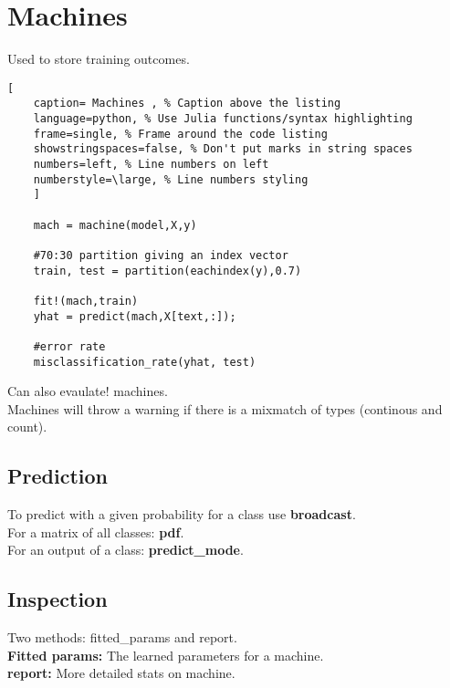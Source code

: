 \documentclass[11pt]{scrartcl} %
\begin{document}
\newpage

\section{Machines}

Used to store training outcomes.

\begin{lstlisting}[
	caption= Machines , % Caption above the listing
	language=python, % Use Julia functions/syntax highlighting
	frame=single, % Frame around the code listing
	showstringspaces=false, % Don't put marks in string spaces
	numbers=left, % Line numbers on left
	numberstyle=\large, % Line numbers styling
	]

	mach = machine(model,X,y)
	
	#70:30 partition giving an index vector
	train, test = partition(eachindex(y),0.7)

	fit!(mach,train)
	yhat = predict(mach,X[text,:]);

	#error rate
	misclassification_rate(yhat, test)

\end{lstlisting}

Can also evaulate! machines.\\

Machines will throw a warning if there is a mixmatch of types (continous and count).

\subsection{Prediction}

To predict with a given probability for a class use \textbf{broadcast}.\\

For a matrix of all classes: \textbf{pdf}.\\

For an output of a class: \textbf{predict\_mode}.

\subsection{Inspection}

Two methods: fitted\_params and report.\\

\textbf{Fitted params:} The learned parameters for a machine.\\

\textbf{report:} More detailed stats on machine.
\end{document}
